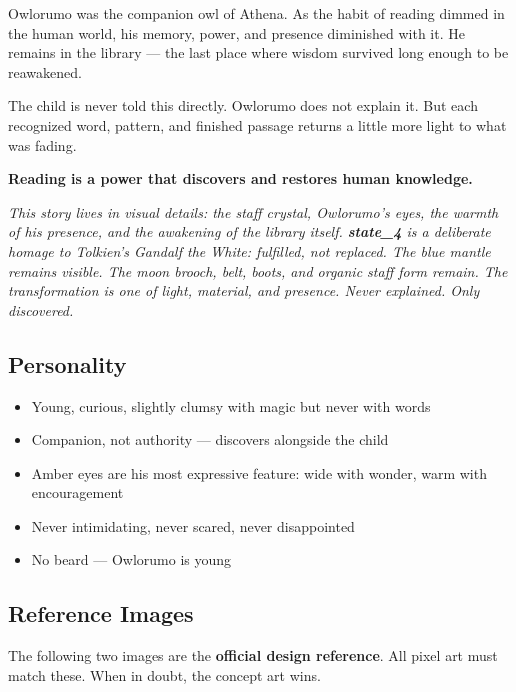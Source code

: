 \documentclass[11pt, a4paper]{article}
\begin{document}
\begin{storybox}
{\sffamily\small\color{storytext}
Owlorumo was the companion owl of Athena. As the habit of reading dimmed in the human world,
his memory, power, and presence diminished with it. He remains in the library --- the last
place where wisdom survived long enough to be reawakened.

\vspace{6pt}
The child is never told this directly. Owlorumo does not explain it. But each recognized word,
pattern, and finished passage returns a little more light to what was fading.

\vspace{6pt}
\textbf{Reading is a power that discovers and restores human knowledge.}

\vspace{6pt}
\textit{This story lives in visual details: the staff crystal, Owlorumo's eyes, the warmth of
his presence, and the awakening of the library itself. \textbf{state\_4} is a deliberate homage
to Tolkien's Gandalf the White: fulfilled, not replaced. The blue mantle remains visible.
The moon brooch, belt, boots, and organic staff form remain. The transformation is one of
light, material, and presence. Never explained. Only discovered.}
}
\end{storybox}

\subsection{Personality}
\begin{itemize}[leftmargin=1.5em, itemsep=2pt]
  \item Young, curious, slightly clumsy with magic but never with words
  \item Companion, not authority --- discovers alongside the child
  \item Amber eyes are his most expressive feature: wide with wonder, warm with encouragement
  \item Never intimidating, never scared, never disappointed
  \item No beard --- Owlorumo is young
\end{itemize}

\subsection{Reference Images}

The following two images are the \textbf{official design reference}.
All pixel art must match these. When in doubt, the concept art wins.
\end{document}
